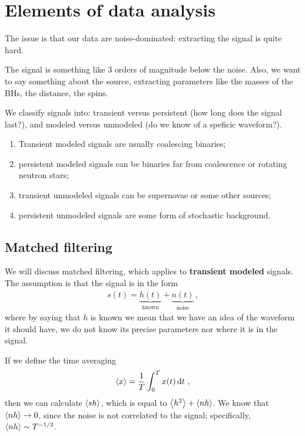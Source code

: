 \documentclass[main.tex]{subfiles}
\begin{document}
\section{Elements of data analysis}


The issue is that our data are noise-dominated: extracting the signal is quite hard.

The signal is something like 3 orders of magnitude below the noise.
Also, we want to say something about the source, extracting parameters like the masses of the BHs, the distance, the spins. 

We classify signals into: transient versus persistent (how long does the signal last?), and modeled versus unmodeled (do we know of a speficic waveform?).
 
\begin{enumerate}
    \item Transient modeled signals are usually coalescing binaries;
    \item persistent modeled signals can be binaries far from coalescence or rotating neutron stars;
    \item transient unmodeled signals can be supernovae or some other sources;
    \item persistent unmodeled signals are some form of stochastic background.
\end{enumerate}

\subsection{Matched filtering}

We will discuss matched filtering, which applies to \textbf{transient modeled} signals.
The assumption is that the signal is in the form 
%
\begin{align}
s(t) = \underbrace{h(t)}_{\text{known}} + \underbrace{n(t)}_{\text{noise}}
\,,
\end{align}
%
where by saying that \(h\) is known we mean that we have an idea of the waveform it should have, we do not know its precise parameters nor where it is in the signal. 

If we define the time averaging 
%
\begin{align}
\expval{x} = \frac{1}{T} \int_{0}^{T} x(t) \dd{t}
\,,
\end{align}
%
then we can  calculate \(\expval{s h}\), which is equal to \(\expval{h^2} + \expval{nh}\). 
We know that \(\expval{nh} \to 0\), since the noise is not correlated to the signal; specifically, \(\expval{nh} \sim T^{-1/2}\).
\end{document}
